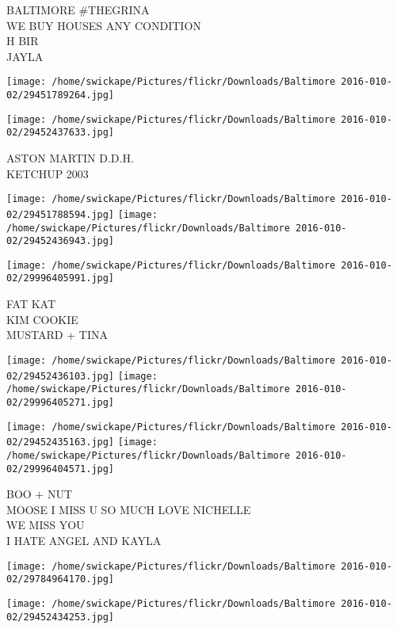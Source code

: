 \documentclass[10pt,letterpaper]{article}
\begin{document}
BALTIMORE \#THEGRINA\\
WE BUY HOUSES ANY CONDITION\\
H BIR\\
JAYLA\\
\pagebreak

\texttt{[image: /home/swickape/Pictures/flickr/Downloads/Baltimore 2016-010-02/29451789264.jpg]}

\vspace{0.25in}
\texttt{[image: /home/swickape/Pictures/flickr/Downloads/Baltimore 2016-010-02/29452437633.jpg]}

ASTON MARTIN D.D.H.\\
KETCHUP 2003\\
\pagebreak

\texttt{[image: /home/swickape/Pictures/flickr/Downloads/Baltimore 2016-010-02/29451788594.jpg]}
\texttt{[image: /home/swickape/Pictures/flickr/Downloads/Baltimore 2016-010-02/29452436943.jpg]}

\vspace{0.25in}
\texttt{[image: /home/swickape/Pictures/flickr/Downloads/Baltimore 2016-010-02/29996405991.jpg]}

FAT KAT\\
KIM COOKIE\\
MUSTARD + TINA\\
\pagebreak

\texttt{[image: /home/swickape/Pictures/flickr/Downloads/Baltimore 2016-010-02/29452436103.jpg]}
\texttt{[image: /home/swickape/Pictures/flickr/Downloads/Baltimore 2016-010-02/29996405271.jpg]}

\texttt{[image: /home/swickape/Pictures/flickr/Downloads/Baltimore 2016-010-02/29452435163.jpg]}
\texttt{[image: /home/swickape/Pictures/flickr/Downloads/Baltimore 2016-010-02/29996404571.jpg]}

BOO + NUT\\
MOOSE I MISS U SO MUCH LOVE NICHELLE\\
WE MISS YOU\\
I HATE ANGEL AND KAYLA\\
\pagebreak

\texttt{[image: /home/swickape/Pictures/flickr/Downloads/Baltimore 2016-010-02/29784964170.jpg]}

\vspace{0.25in}
\texttt{[image: /home/swickape/Pictures/flickr/Downloads/Baltimore 2016-010-02/29452434253.jpg]}
\end{document}
